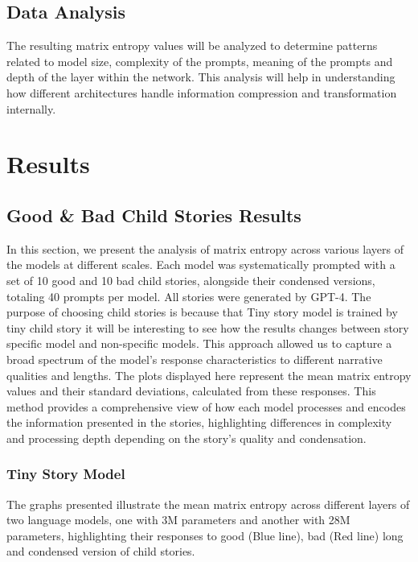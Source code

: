 \documentclass{article}
\begin{document}
\subsection{Data Analysis} The resulting matrix entropy values will be analyzed to determine patterns related to model size, complexity of the prompts, meaning of the prompts and depth of the layer within the network. This analysis will help in understanding how different architectures handle information compression and transformation internally.




\section{Results}
\label{others}

\subsection{Good \& Bad Child Stories Results}

In this section, we present the analysis of matrix entropy across various layers of the models at different scales. Each model was systematically prompted with a set of 10 good and 10 bad child stories, alongside their condensed versions, totaling 40 prompts per model. All stories were generated by GPT-4. The purpose of choosing child stories is because that Tiny story model is trained by tiny child story it will be interesting to see how the results changes between story specific model and non-specific models. This approach allowed us to capture a broad spectrum of the model's response characteristics to different narrative qualities and lengths. The plots displayed here represent the mean matrix entropy values and their standard deviations, calculated from these responses. This method provides a comprehensive view of how each model processes and encodes the information presented in the stories, highlighting differences in complexity and processing depth depending on the story's quality and condensation.


\subsubsection{Tiny Story Model}
The graphs presented illustrate the mean matrix entropy across different layers of two language models, one with 3M parameters and another with 28M parameters, highlighting their responses to good (Blue line), bad (Red line) long and condensed version of child stories.
\end{document}
